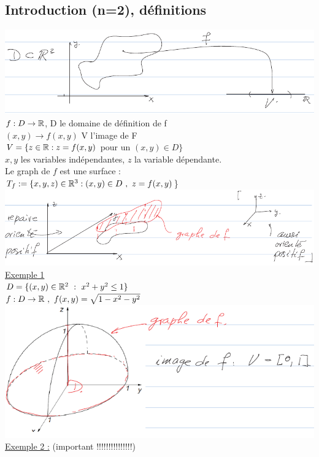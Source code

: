 \documentclass[12pt,a4paper]{article}
\begin{document}
\subsection{Introduction (n=2), définitions}
\includegraphics[scale=0.5]{images/fonction_deux_variables}\\
$f:D\to \mathbb{R}$, D le domaine de définition de f\\
$(x,y) \to f(x,y)$ V l'image de F\\
$V = \{z\in \mathbb{R} : z = f(x,y)$ pour un $(x,y)\in D\}$\\
$x,y$ les variables indépendantes, $z$ la variable dépendante.\\
Le graph de $f$ est une surface :\\
$T_f := \{x,y,z)\in\mathbb{R}^3 : (x,y) \in D \ , \ z = f(x,y)$\}\\
\includegraphics[scale=0.5]{images/repere_oriente_positif}\\
\underline{Exemple 1} \\
$D = \{(x,y) \in \mathbb{R}^2 \ : \ x^2+y^2 \leq 1\}$\\
$f:D\to \mathbb{R} \ , \ f(x,y) = \sqrt{1-x^2-y^2}$\\
\includegraphics[scale=0.5]{images/demi_sphere}\\
\underline{Exemple 2 :} (important !!!!!!!!!!!!!!!)\\
\end{document}
